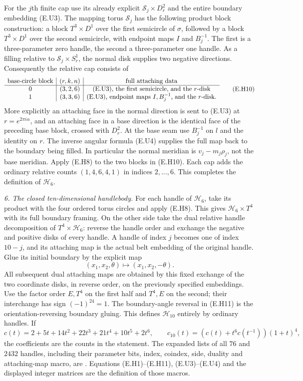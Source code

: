 For the $j$th finite cap use its already explicit
$\mathcal S_j\times D^2_r$ and the entire boundary embedding
(E.U3).  The mapping torus $\mathcal S_j$ has the following product
block construction: a block $T^3\times D^1$ over the first
semicircle of $\sigma$, followed by a block $T^3\times D^1$ over
the second semicircle, with endpoint maps $I$ and $B_j^{-1}$.
The first is a three-parameter zero handle, the second a
three-parameter one handle.  As a filling relative to
$\mathcal S_j\times S^1_r$, the normal disk supplies two negative
directions.  Consequently the relative cap consists of
\[
 \begin{array}{c|c|c}
 \hbox{base-circle block}&(r,k,n)&\hbox{full attaching data}\\ \hline
 0&(3,2,6)&\hbox{(E.U3), the first semicircle, and the $r$-disk}\\
 1&(3,3,6)&\hbox{(E.U3), endpoint maps $I,B_j^{-1}$, and the $r$-disk}.
 \end{array}
 \tag{E.H10}
\]
More explicitly an attaching face in the normal direction is sent
to (E.U3) at $r=e^{2\pi i\alpha}$, and an attaching face in a
base direction is the identical face of the preceding base block,
crossed with $D^2_r$.  At the base seam use $B_j^{-1}$ on $l$ and
the identity on $r$.  The inverse angular formula (E.U4) supplies
the full map back to the boundary being filled.  In particular
the normal meridian is $v_j-m_j\rho_j$, not the base meridian.
Apply (E.H8) to the two blocks in (E.H10).  Each cap adds the
ordinary relative counts $(1,4,6,4,1)$ in indices $2,\ldots,6$.
This completes the definition of $\mathcal H_6$.

\emph{6. The closed ten-dimensional handlebody.}
For each handle of $\mathcal H_6$, take its product with the four
ordered torus circles and apply (E.H8).  This gives
$\mathcal H_6\times T^4$ with its full boundary framing.  On the
other side take the dual relative handle decomposition of
$T^4\times\mathcal H_6$: reverse the handle order and exchange
the negative and positive disks of every handle.  A handle of
index $j$ becomes one of index $10-j$, and its attaching map is
the actual belt embedding of the original handle.  Glue its
initial boundary by the explicit map
\[
                 (x_1,x_2,\theta)\longmapsto
                                    (x_1,x_2,-\theta).
 \tag{E.H11}
\]
All subsequent dual attaching maps are obtained by this fixed
exchange of the two coordinate disks, in reverse order, on the
previously specified embeddings.  Use the factor order $E,T^4$
on the first half and $T^4,E$ on the second; their interchange
has sign $(-1)^{24}=1$.  The boundary-angle reversal in (E.H11)
is the orientation-reversing boundary gluing.  This defines
$\mathcal H_{10}$ entirely by ordinary handles.  If
\[
 c(t)=2+5t+14t^2+22t^3+21t^4+10t^5+2t^6,
 \qquad
       c_{10}(t)=(c(t)+t^6c(t^{-1}))(1+t)^4,
 \tag{E.H12}
\]
the coefficients are the counts in the statement.  The expanded
lists of all $76$ and $2432$ handles, including their parameter
bits, index, coindex, side, duality and attaching-map macro, are
.  Equations
(E.H1)--(E.H11), (E.U3)--(E.U4) and the displayed integer matrices
are the definition of those macros.

